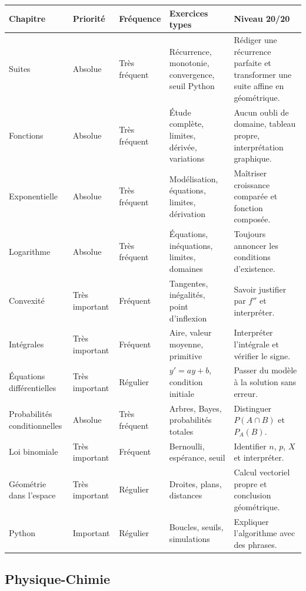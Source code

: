 \documentclass[11pt,a4paper]{article}
\begin{document}
\footnotesize
\begin{longtable}{|p{3cm}|p{2.6cm}|p{2.6cm}|p{4.2cm}|p{4.2cm}|}
\hline
\textbf{Chapitre} & \textbf{Priorité} & \textbf{Fréquence} & \textbf{Exercices types} & \textbf{Niveau 20/20}\\
\hline
Suites & Absolue & Très fréquent & Récurrence, monotonie, convergence, seuil Python & Rédiger une récurrence parfaite et transformer une suite affine en géométrique.\\
\hline
Fonctions & Absolue & Très fréquent & Étude complète, limites, dérivée, variations & Aucun oubli de domaine, tableau propre, interprétation graphique.\\
\hline
Exponentielle & Absolue & Très fréquent & Modélisation, équations, limites, dérivation & Maîtriser croissance comparée et fonction composée.\\
\hline
Logarithme & Absolue & Très fréquent & Équations, inéquations, limites, domaines & Toujours annoncer les conditions d'existence.\\
\hline
Convexité & Très important & Fréquent & Tangentes, inégalités, point d'inflexion & Savoir justifier par $f''$ et interpréter.\\
\hline
Intégrales & Très important & Fréquent & Aire, valeur moyenne, primitive & Interpréter l'intégrale et vérifier le signe.\\
\hline
Équations différentielles & Très important & Régulier & $y'=ay+b$, condition initiale & Passer du modèle à la solution sans erreur.\\
\hline
Probabilités conditionnelles & Absolue & Très fréquent & Arbres, Bayes, probabilités totales & Distinguer $P(A\cap B)$ et $P_A(B)$.\\
\hline
Loi binomiale & Très important & Fréquent & Bernoulli, espérance, seuil & Identifier $n$, $p$, $X$ et interpréter.\\
\hline
Géométrie dans l'espace & Très important & Régulier & Droites, plans, distances & Calcul vectoriel propre et conclusion géométrique.\\
\hline
Python & Important & Régulier & Boucles, seuils, simulations & Expliquer l'algorithme avec des phrases.\\
\hline
\end{longtable}
\normalsize

\subsection{Physique-Chimie}
\end{document}
